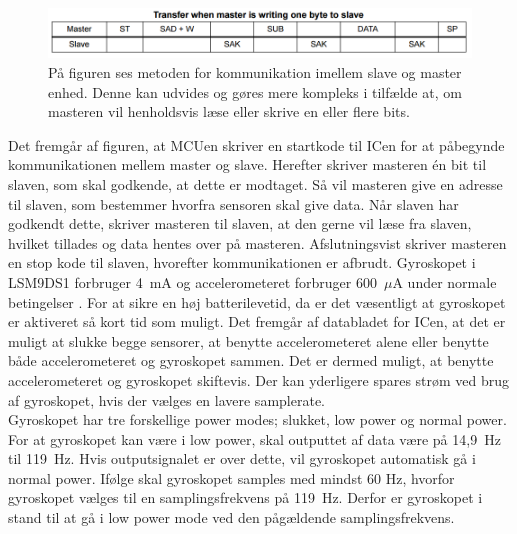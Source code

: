 \begin{figure}[H]
	\centering
	\includegraphics[scale=0.75]{figures/cDesign/Sensor_write_read2.png}
	\caption{På figuren ses metoden for kommunikation imellem slave og master enhed. Denne kan udvides og gøres mere kompleks i tilfælde at, om masteren vil henholdsvis læse eller skrive en eller flere bits.\citep{STMicroelectronics2016}}
	\label{Fig:master_slave}
\end{figure}

Det fremgår af figuren, at MCUen skriver en startkode til ICen for at påbegynde kommunikationen mellem master og slave. Herefter skriver masteren én bit til slaven, som skal godkende, at dette er modtaget. Så vil masteren give en adresse til slaven, som bestemmer hvorfra sensoren skal give data. Når slaven har godkendt dette, skriver masteren til slaven, at den gerne vil læse fra slaven, hvilket tillades og data hentes over på masteren. Afslutningsvist skriver masteren en stop kode til slaven, hvorefter kommunikationen er afbrudt. %
Gyroskopet i LSM9DS1 forbruger 4~mA og accelerometeret forbruger 600~$\mu$A under normale betingelser \citep{Jimb02016} . For at sikre en høj batterilevetid, da er det væsentligt at gyroskopet er aktiveret så kort tid som muligt. Det fremgår af databladet for ICen, at det er muligt at slukke begge sensorer, at benytte accelerometeret alene eller benytte både accelerometeret og gyroskopet sammen. Det er dermed muligt, at benytte accelerometeret og gyroskopet skiftevis. Der kan yderligere spares strøm ved brug af gyroskopet, hvis der vælges en lavere samplerate.\\ %
Gyroskopet har tre forskellige power modes; slukket, low power og normal power. For at gyroskopet kan være i low power, skal outputtet af data være på 14,9~Hz til 119~Hz. Hvis outputsignalet er over dette, vil gyroskopet automatisk gå i normal power. Ifølge  skal gyroskopet samples med mindst 60 Hz, hvorfor gyroskopet vælges til en samplingsfrekvens på 119~Hz. Derfor er gyroskopet i stand til at gå i low power mode ved den pågældende samplingsfrekvens. \citep{STMicroelectronics2016}

